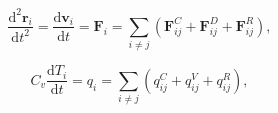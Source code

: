 \documentclass[12pt]{article}
\begin{document}
$$
  \frac{\mathrm{d}^2 \mathbf{r}_i}{\mathrm{d} t^2}=
  \frac{\mathrm{d} \mathbf{v}_i}{\mathrm{d} t}
  =\mathbf{F}_{i}=\sum_{i\neq j}(\mathbf{F}_{ij}^{C}+\mathbf{F}_{ij}^{D}+\mathbf{F}_{ij}^{R}),
$$

$$
  C_v\frac{\mathrm{d} T_i}{\mathrm{d} t}= q_{i} = \sum_{i\neq j}(q_{ij}^{C}+q_{ij}^{V}+q_{ij}^{R}),
$$
\end{document}
